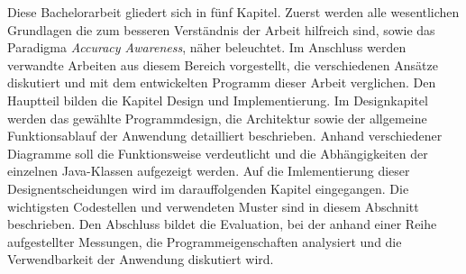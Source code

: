 Diese Bachelorarbeit gliedert sich in f\"unf Kapitel. Zuerst werden alle wesentlichen Grundlagen die zum besseren Verst\"andnis der Arbeit hilfreich sind, sowie das Paradigma \textit{Accuracy Awareness}, n\"aher beleuchtet. Im Anschluss werden verwandte Arbeiten aus diesem Bereich vorgestellt, die verschiedenen Ans\"atze diskutiert und mit dem entwickelten Programm dieser Arbeit verglichen. Den Hauptteil bilden die Kapitel Design und Implementierung. Im Designkapitel werden das gew\"ahlte Programmdesign, die Architektur sowie der allgemeine Funktionsablauf der Anwendung detailliert beschrieben. Anhand verschiedener Diagramme soll die Funktionsweise verdeutlicht und die Abh\"angigkeiten der einzelnen Java-Klassen aufgezeigt werden. Auf die Imlementierung dieser Designentscheidungen wird im darauffolgenden Kapitel eingegangen. Die wichtigsten Codestellen und verwendeten Muster sind in diesem Abschnitt beschrieben. Den Abschluss bildet die Evaluation, bei der anhand einer Reihe aufgestellter Messungen, die Programmeigenschaften analysiert und die Verwendbarkeit der Anwendung diskutiert wird.
